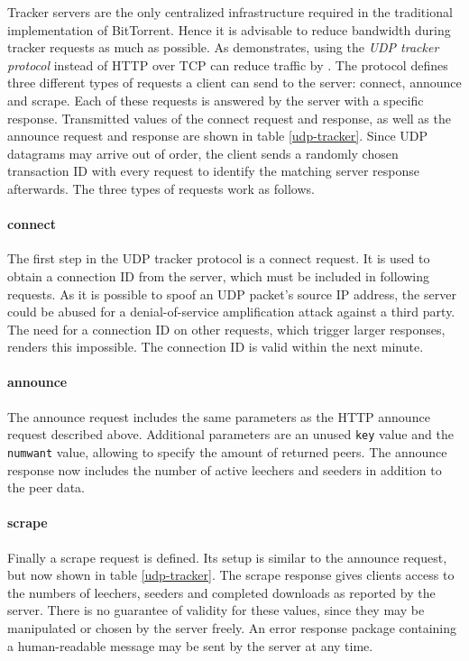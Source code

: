 \documentclass[10pt, a4paper, twoside, headsepline]{scrbook}
\renewcommand{\_}{\origunderscore\allowbreak}
\begin{document}
Tracker servers are the only centralized infrastructure required in the traditional implementation of BitTorrent. Hence it is advisable to reduce bandwidth during tracker requests as much as possible. As \cite{bep15} demonstrates, using the \emph{UDP tracker protocol} instead of HTTP over TCP can reduce traffic by . The protocol defines three different types of requests a client can send to the server: connect, announce and scrape. Each of these requests is answered by the server with a specific response. Transmitted values of the connect request and response, as well as the announce request and response are shown in table \ref{udp-tracker}. Since UDP datagrams may arrive out of order, the client sends a randomly chosen transaction ID with every request to identify the matching server response afterwards. The three types of requests work as follows.

\paragraph{connect}
The first step in the UDP tracker protocol is a connect request. It is used to obtain a connection ID from the server, which must be included in following requests. As it is possible to spoof an UDP packet's source IP address, the server could be abused for a denial-of-service amplification attack against a third party. The need for a connection ID on other requests, which trigger larger responses, renders this impossible. The connection ID is valid within the next minute.

\paragraph{announce}
The announce request includes the same parameters as the HTTP announce request described above. Additional parameters are an unused \texttt{key} value and the \texttt{num\_want} value, allowing to specify the amount of returned peers. The announce response now includes the number of active leechers and seeders in addition to the peer data.

\paragraph{scrape}
Finally a scrape request is defined. Its setup is similar to the announce request, but now shown in table \ref{udp-tracker}. The scrape response gives clients access to the numbers of leechers, seeders and completed downloads as reported by the server. There is no guarantee of validity for these values, since they may be manipulated or chosen by the server freely. An error response package containing a human-readable message may be sent by the server at any time.
\end{document}
